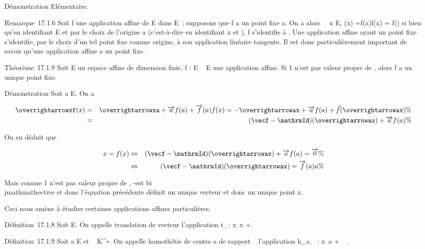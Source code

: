 \documentclass[]{article}
\begin{document}
Démonstration Elémentaire.

Remarque~17.1.6 Soit f une application affine de E dans E~; supposons
que f a un point fixe a. On a alors \forall~~x \in E,
\overrightarrowaf(x)
=\overrightarrow f(a)f(x) =\vec
f(\overrightarrowax) si bien qu'en identifiant E et
\overrightarrowE par le choix de l'origine a
(c'est-à-dire en identifiant x et \overrightarrowax),
f s'identifie à \vecf. Une application affine ayant
un point fixe s'identifie, par le choix d'un tel point fixe comme
origine, à son application linéaire tangente. Il est donc
particulièrement important de savoir qu'une application affine a un
point fixe.

Théorème~17.1.9 Soit E un espace affine de dimension finie, f : E \rightarrow~ E
une application affine. Si 1 n'est pas valeur propre de
\vecf, alors f a un unique point fixe.

Démonstration Soit a \in E. On a

\begin{align*}
\overrightarrowxf(x)& =&
\overrightarrowxa +\overrightarrow
af(a) +\overrightarrow f(a)f(x) =
-\overrightarrowax +\overrightarrow
af(a) +\vec
f(\overrightarrowax)\%&
\\ & =& (\vecf
-\mathrmId)(\overrightarrowax)
+\overrightarrow af(a) \%&
\\ \end{align*}

On en déduit que

\begin{align*} x = f(x)&
\Leftrightarrow & (\vecf
-\mathrmId)(\overrightarrowax)
+\overrightarrow af(a)
=\overrightarrow 0\%&
\\ & \Leftrightarrow &
(\vecf
-\mathrmId)(\overrightarrowax)
=\overrightarrow f(a)a \%&
\\ \end{align*}

Mais comme 1 n'est pas valeur propre de \vecf,
\vecf -\mathrmId est bi\\jmathmathective et
donc l'équation précédente définit un unique vecteur
\overrightarrowax et donc un unique point x.

Ceci nous amène à étudier certaines applications affines particulières.

Définition~17.1.8 Soit \overrightarrow\xi
\in\overrightarrow E. On appelle translation de vecteur
\overrightarrow\xi l'application
t_\overrightarrow\xi :
x\mapsto~x +\overrightarrow \xi.

Définition~17.1.9 Soit a \in E et \lambda~ \in K^∗. On appelle
homothétie de centre a de rapport \lambda~ l'application h_a,\lambda~ :
x\mapsto~a + \lambda~ \overrightarrowax.
\end{document}
